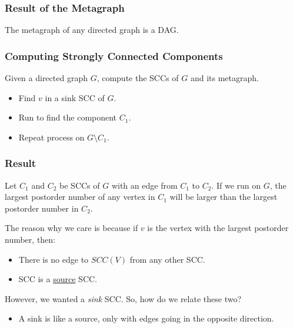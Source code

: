 \documentclass[letterpaper]{article}
\begin{document}
\subsubsection{Result of the Metagraph}
\begin{theorem}{}{}
    The metagraph of any directed graph is a DAG. 
\end{theorem}

\subsubsection{Computing Strongly Connected Components}
Given a directed graph $G$, compute the SCCs of $G$ and its metagraph. 
\begin{itemize}
    \item Find $v$ in a sink SCC of $G$. 
    \item Run  to find the component $C_1$.
    \item Repeat process on $G \setminus C_1$.
\end{itemize}

\subsubsection{Result}
\begin{proposition}
    Let $C_1$ and $C_2$ be SCCs of $G$ with an edge from $C_1$ to $C_2$. If we run  on $G$, the largest postorder number of any vertex in $C_1$ will be larger than the largest postorder number in $C_2$. 
\end{proposition}
The reason why we care is because if $v$ is the vertex with the largest postorder number, then: 
\begin{itemize}
    \item There is no edge to $SCC(V)$ from any other SCC. 
    \item SCC is a \underline{source} SCC.
\end{itemize}
However, we wanted a \emph{sink} SCC. So, how do we relate these two?
\begin{itemize}
    \item A sink is like a source, only with edges going in the opposite direction.
\end{itemize}
\end{document}
